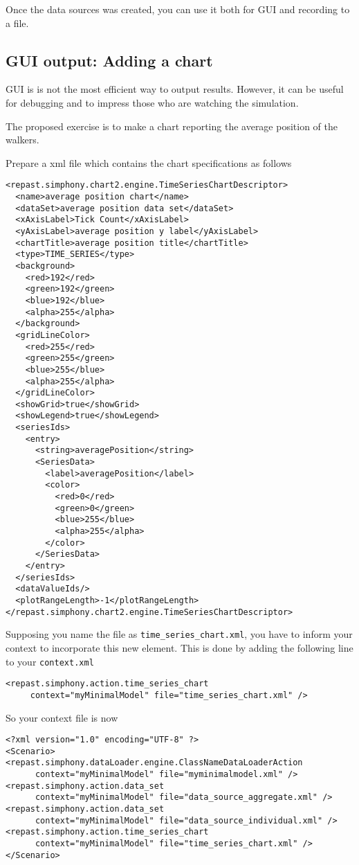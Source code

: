 \documentclass{article}
\begin{document}
Once the data sources was created, you can use it both for GUI and recording to a file.

\subsection{GUI output: Adding a chart}

GUI is is not the most efficient way to output results. However, it can be useful for debugging and to impress those who are watching the simulation.

The proposed exercise is to make a chart reporting the average position of the walkers.


Prepare a xml file which contains the chart specifications as follows 

\begin{verbatim}
<repast.simphony.chart2.engine.TimeSeriesChartDescriptor>
  <name>average position chart</name>
  <dataSet>average position data set</dataSet>
  <xAxisLabel>Tick Count</xAxisLabel>
  <yAxisLabel>average position y label</yAxisLabel>
  <chartTitle>average position title</chartTitle>
  <type>TIME_SERIES</type>
  <background>
    <red>192</red>
    <green>192</green>
    <blue>192</blue>
    <alpha>255</alpha>
  </background>
  <gridLineColor>
    <red>255</red>
    <green>255</green>
    <blue>255</blue>
    <alpha>255</alpha>
  </gridLineColor>
  <showGrid>true</showGrid>
  <showLegend>true</showLegend>
  <seriesIds>
    <entry>
      <string>averagePosition</string>
      <SeriesData>
        <label>averagePosition</label>
        <color>
          <red>0</red>
          <green>0</green>
          <blue>255</blue>
          <alpha>255</alpha>
        </color>
      </SeriesData>
    </entry>
  </seriesIds>
  <dataValueIds/>
  <plotRangeLength>-1</plotRangeLength>
</repast.simphony.chart2.engine.TimeSeriesChartDescriptor>
\end{verbatim}

Supposing you name the file as \verb+time_series_chart.xml+, you have to inform your context to incorporate this new element. This is done by adding the following line to your \verb+context.xml+

\begin{verbatim}
<repast.simphony.action.time_series_chart 
     context="myMinimalModel" file="time_series_chart.xml" />
\end{verbatim}

So your context file is now

\begin{verbatim}
<?xml version="1.0" encoding="UTF-8" ?>
<Scenario>
<repast.simphony.dataLoader.engine.ClassNameDataLoaderAction 
      context="myMinimalModel" file="myminimalmodel.xml" />
<repast.simphony.action.data_set 
      context="myMinimalModel" file="data_source_aggregate.xml" />
<repast.simphony.action.data_set 
      context="myMinimalModel" file="data_source_individual.xml" />
<repast.simphony.action.time_series_chart 
      context="myMinimalModel" file="time_series_chart.xml" />
</Scenario>
\end{verbatim}
\end{document}
